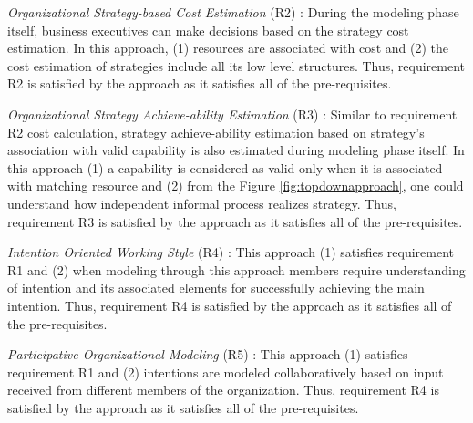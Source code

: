 \textit{Organizational Strategy-based Cost Estimation} (R2) : During the modeling phase itself, business executives can make decisions based on the strategy cost estimation. In this approach, (1) resources are associated with cost and (2) the cost estimation of strategies include all its low level structures. Thus, requirement R2 is satisfied by the approach as it satisfies all of the pre-requisites. 

\textit{Organizational Strategy Achieve-ability Estimation} (R3) : Similar to requirement R2 cost calculation, strategy achieve-ability estimation based on strategy's association with valid capability is also estimated during modeling phase itself. In this approach (1) a capability is considered as valid only when it is associated with matching resource and (2) from the Figure \ref{fig:topdownapproach}, one could understand how independent informal process realizes strategy. Thus, requirement R3 is satisfied by the approach as it satisfies all of the pre-requisites.

\textit{Intention Oriented Working Style} (R4) : This approach (1) satisfies requirement R1 and (2) when modeling through this approach members require understanding of intention and its associated elements for successfully achieving the main intention. Thus, requirement R4 is satisfied by the approach as it satisfies all of the pre-requisites.

\textit{Participative Organizational Modeling} (R5) : This approach (1) satisfies requirement R1 and  (2) intentions are modeled collaboratively based on input received from different members of the organization. Thus, requirement R4 is satisfied by the approach as it satisfies all of the pre-requisites. 

